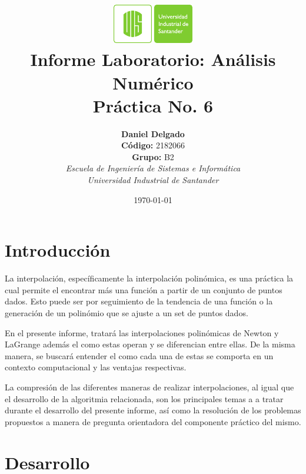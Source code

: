 \documentclass[english,notitlepage,letterpaper, 10pt]{article} %
\newcommand{\university}{\normalsize Universidad Industrial de Santander}
\newcommand{\faculty}{\normalsize  Escuela de Ingenier\'ia de Sistemas e Inform\'atica}
\newcommand{\codigo}{\normalsize  2182066}
\newcommand{\grupo}{\normalsize  B2}
\begin{document}
\title{	\vspace{-12mm}\includegraphics[width=0.2\linewidth]{Logos/UIS.pdf}\\Informe Laboratorio: An\'alisis Num\'erico\\  \centering Pr\'actica No. 6}
\author{
  \textbf{Daniel Delgado} \\ \textbf{C\'odigo:} \codigo\\
  \textbf{Grupo:} \grupo\\
  \textit{\faculty}\\
  \textit{\university}}
\date{\today}
\maketitle

\section{Introducci\'on}

La interpolación, específicamente la interpolación polinómica, es una práctica la cual permite el encontrar más una función a partir de un conjunto de puntos dados. Esto puede ser por seguimiento de la tendencia de una función o la generación de un polinómio que se ajuste a un set de puntos dados.

En el presente informe, tratará las interpolaciones polinómicas de Newton y LaGrange además el como estas operan y se diferencian entre ellas. De la misma manera, se buscará entender el como cada una de estas se comporta en un contexto computacional y las ventajas respectivas.

La compresión de las diferentes maneras de realizar interpolaciones, al igual que el desarrollo de la algoritmia relacionada, son los principales temas a a tratar durante el desarrollo del presente informe, así como la resolución de los problemas propuestos a manera de pregunta orientadora del componente práctico del mismo.

\section{Desarrollo}
\end{document}
